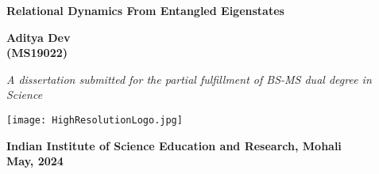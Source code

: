 \begin{titlepage}

    \begin{center}
        \sffamily
        \LARGE
        \textbf{Relational Dynamics From Entangled Eigenstates}
        \vspace{1cm}
        
        \Large
        \textbf{Aditya Dev \\ \large (MS19022)}
    
        \vspace{1cm}
        \large
        
        \textit{A dissertation submitted for the partial fulfillment of BS-MS dual degree in Science}
        
        \vspace{2.5cm}
    
        \texttt{[image: HighResolutionLogo.jpg]}
        \vspace{1cm}
        
        \large
        \textbf{Indian Institute of Science Education and Research, Mohali}\\
        \large
        \textbf{May, 2024} 
    
    \end{center}
    
    
    \end{titlepage}